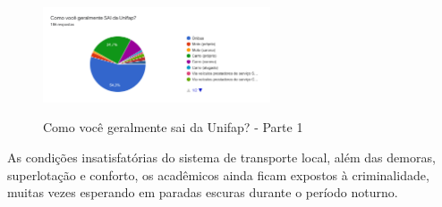 \begin{figure}[!hbtp]
	\centering
	\caption{Como você geralmente sai da Unifap? - Parte 1}
	\includegraphics[width=0.6\textwidth]{./04-figuras/questionario/9.png}
	\label{fig:saidadaunifap1}
\end{figure}

As condições insatisfatórias do sistema de transporte local, além das demoras, superlotação e conforto, os acadêmicos ainda ficam expostos à criminalidade, muitas vezes esperando em paradas escuras durante o período noturno.

